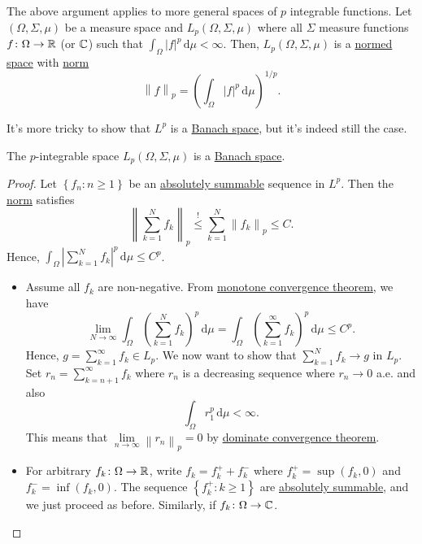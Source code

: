 \begin{remark}
	The above argument applies to more general spaces of \(p\) integrable functions. Let \((\Omega , \Sigma , \mu )\) be a measure space and \(L_p(\Omega , \Sigma , \mu )\) where all \(\Sigma \) measure functions \(f\colon \Omega \to \mathbb{\MakeUppercase{r}} \) (or \(\mathbb{\MakeUppercase{c}} \)) such that \(\int _\Omega \left\vert f \right\vert ^p \,\mathrm{d} \mu < \infty \). Then, \(L_p(\Omega , \Sigma , \mu )\) is a \hyperref[def:normed-vector-space]{normed space} with \hyperref[def:norm]{norm}
	\[
		\left\lVert f\right\rVert _p = \left( \int _\Omega \left\vert f \right\vert ^p \,\mathrm{d} \mu  \right) ^{1 / p}.
	\]
\end{remark}

It's more tricky to show that \(L^p\) is a \hyperref[def:Banach-space]{Banach space}, but it's indeed still the case.
\begin{theorem}
	The \(p\)-integrable space \(L_p(\Omega , \Sigma , \mu )\) is a \hyperref[def:Banach-space]{Banach space}.
\end{theorem}
\begin{proof}
	Let \(\left\{ f_n\colon n\geq 1 \right\} \) be an \hyperref[def:absolutely-summable]{absolutely summable} sequence in \(L^p\). Then the \hyperref[def:norm]{norm} satisfies
	\[
		\left\lVert \sum_{k=1}^{N} f_k\right\rVert _p \overset{\hyperref[lma:Minkowski-ineq]{\text{!}}}{\leq} \sum_{k=1}^{N} \left\lVert f_k\right\rVert _p \leq C.
	\]
	Hence, \(\int _\Omega \left\vert \sum_{k=1}^{N} f_k \right\vert^p \,\mathrm{d} \mu  \leq C^p\).
	\begin{itemize}
		\item Assume all \(f_k\) are non-negative. From \href{https://en.wikipedia.org/wiki/Monotone_convergence_theorem}{monotone convergence theorem}, we have
		      \[
			      \lim\limits_{N \to \infty} \int _\Omega \left( \sum_{k=1}^{N} f_k \right) ^p \,\mathrm{d} \mu = \int _\Omega \left( \sum_{k=1}^{\infty} f_k \right)^p \,\mathrm{d} \mu \leq C^p.
		      \]
		      Hence, \(g = \sum_{k=1}^{\infty} f_k\in L_p\). We now want to show that \(\sum_{k=1}^{N} f_k \to g\) in \(L_p\). Set \(r_n = \sum_{k=n+1}^{\infty} f_k\) where \(r_n\) is a decreasing sequence where \(r_n \to 0\) a.e. and also
		      \[
			      \int _\Omega r_1^p\,\mathrm{d} \mu < \infty.
		      \]
		      This means that \(\lim\limits_{n \to \infty} \left\lVert r_n\right\rVert _p = 0\) by \href{https://en.wikipedia.org/wiki/Dominated_convergence_theorem}{dominate convergence theorem}.
		\item For arbitrary \(f_k\colon \Omega \to \mathbb{\MakeUppercase{r}} \), write \(f_k = f^+_k + f^-_k\) where \(f^+_k = \sup (f_k, 0)\) and \(f_k^- = \inf (f_k, 0)\). The sequence \(\left\{ f_k^+\colon k\geq 1 \right\} \) are \hyperref[def:absolutely-summable]{absolutely summable}, and we just proceed as before. Similarly, if \(f_k\colon \Omega \to \mathbb{\MakeUppercase{c}} \).
	\end{itemize}
\end{proof}

